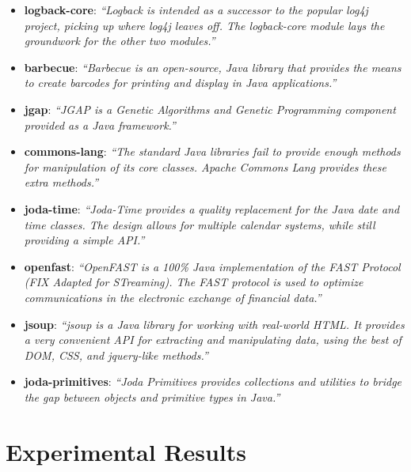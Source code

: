 \begin{itemize}
  \item \textbf{logback-core}: \emph{``Logback is intended as a successor to the popular log4j project, picking up where log4j leaves off. The logback-core module lays the groundwork for the other two modules.''}~\cite{logback}
  \item \textbf{barbecue}: \emph{``Barbecue is an open-source, Java library that provides the means to create barcodes for printing and display in Java applications.''}~\cite{barbecue}
  \item \textbf{jgap}: \emph{``JGAP is a Genetic Algorithms and Genetic Programming component provided as a Java framework.''}~\cite{jgap}
  \item \textbf{commons-lang}: \emph{``The standard Java libraries fail to provide enough methods for manipulation of its core classes. Apache Commons Lang provides these extra methods.''}\cite{commons-lang}
  \item \textbf{joda-time}: \emph{``Joda-Time provides a quality replacement for the Java date and time classes. The design allows for multiple calendar systems, while still providing a simple API.''}~\cite{joda-time}
  \item \textbf{openfast}: \emph{``OpenFAST is a 100\% Java implementation of the FAST Protocol (FIX Adapted for STreaming). The FAST protocol is used to optimize communications in the electronic exchange of financial data.''}~\cite{openfast}
  \item \textbf{jsoup}: \emph{``jsoup is a Java library for working with real-world HTML. It provides a very convenient API for extracting and manipulating data, using the best of DOM, CSS, and jquery-like methods.''}~\cite{jsoup}
  \item \textbf{joda-primitives}: \emph{``Joda Primitives provides collections and utilities to bridge the gap between objects and primitive types in Java.''}~\cite{joda-primitives}
\end{itemize}


\section{Experimental Results}
\label{sec:experiment_results}
